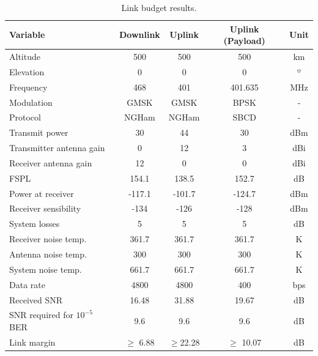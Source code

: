 \begin{table}[!ht]
    \centering
    \begin{tabular}{L{0.3\textwidth}cccc}
        \toprule[1.5pt]
        \textbf{Variable} & \textbf{Downlink} & \textbf{Uplink} & \textbf{Uplink (Payload)} & \textbf{Unit}\\
        \midrule
        Altitude                        & 500           & 500           & 500           & km \\
        Elevation                       & 0             & 0             & 0             & º \\
        Frequency                       & 468           & 401           & 401.635       & MHz \\
        Modulation                      & GMSK          & GMSK          & BPSK          & - \\
        Protocol                        & NGHam         & NGHam         & SBCD          & - \\
        Transmit power                  & 30            & 44            & 30            & dBm \\
        Transmitter antenna gain        & 0             & 12            & 3             & dBi \\
        Receiver antenna gain           & 12            & 0             & 0             & dBi \\
        FSPL                            & 154.1         & 138.5         & 152.7         & dB \\
        Power at receiver               & -117.1        & -101.7        & -124.7        & dBm \\
        Receiver sensibility            & -134          & -126          & -128          & dBm \\
        System losses                   & 5             & 5             & 5             & dB \\
        Receiver noise temp.            & 361.7         & 361.7         & 361.7         & K \\
        Antenna noise temp.             & 300           & 300           & 300           & K \\
        System noise temp.              & 661.7         & 661.7         & 661.7         & K \\
        Data rate                       & 4800          & 4800          & 400           & bps \\
        Received SNR                    & 16.48         & 31.88         & 19.67         & dB \\
        SNR required for $10^{-5}$ BER\footnotemark & 9.6           & 9.6           & 9.6           & dB \\
        Link margin                     & $\geq$ 6.88   & $\geq$22.28   & $\geq$ 10.07  & dB \\
        \bottomrule[1.5pt]
    \end{tabular}
    \caption{Link budget results.}
    \label{tab:link-budget-results}
\end{table}

